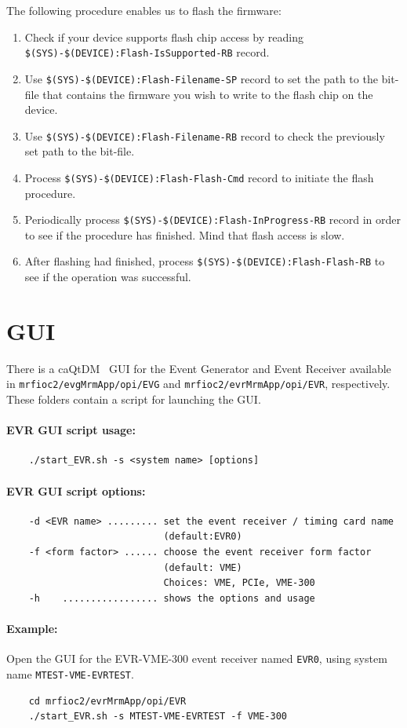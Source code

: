 \documentclass[12pt,a4paper]{article}
\let\stdsection\section
\renewcommand\section{\newpage\stdsection}
\begin{document}
The following procedure enables us to flash the firmware:
\begin{enumerate}
	\item Check if your device supports flash chip access by reading \newline\texttt{\$(SYS)-\$(DEVICE):Flash-IsSupported-RB} record.
	\item Use \texttt{\$(SYS)-\$(DEVICE):Flash-Filename-SP} record to set the path to the bit-file that contains the firmware you wish to write to the flash chip on the device.
	\item Use \texttt{\$(SYS)-\$(DEVICE):Flash-Filename-RB} record to check the previously set path to the bit-file.
	\item Process \texttt{\$(SYS)-\$(DEVICE):Flash-Flash-Cmd} record to initiate the flash procedure. 
	\item Periodically process \texttt{\$(SYS)-\$(DEVICE):Flash-InProgress-RB} record in order to see if the procedure has finished. Mind that flash access is slow.
	\item After flashing had finished, process \texttt{\$(SYS)-\$(DEVICE):Flash-Flash-RB} to see if the operation was successful.
\end{enumerate}


\section{GUI}\label{sec:GUI}
There is a caQtDM~\cite{caqtdm} GUI for the Event Generator and Event Receiver available in \texttt{mrfioc2/evgMrmApp/opi/EVG} and \texttt{mrfioc2/evrMrmApp/opi/EVR}, respectively. These folders contain a script for launching the GUI.

\paragraph{EVR GUI script usage:}
\begin{verbatim}
	./start_EVR.sh -s <system name> [options]
\end{verbatim}


\paragraph{EVR GUI script options:}
\begin{verbatim}
	-d <EVR name> ......... set the event receiver / timing card name 
	                        (default:EVR0)
	-f <form factor> ...... choose the event receiver form factor 
	                        (default: VME)
	                        Choices: VME, PCIe, VME-300
	-h    ................. shows the options and usage
\end{verbatim}


\paragraph{Example:} Open the GUI for the EVR-VME-300 event receiver named \texttt{EVR0}, using system name \texttt{MTEST-VME-EVRTEST}.
\begin{verbatim}
	cd mrfioc2/evrMrmApp/opi/EVR
	./start_EVR.sh -s MTEST-VME-EVRTEST -f VME-300
\end{verbatim}




\end{document}
